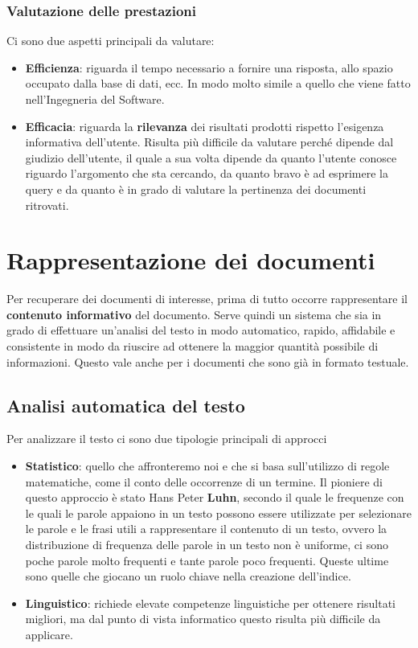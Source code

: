 \subsection{Valutazione delle prestazioni}

Ci sono due aspetti principali da valutare:

\begin{itemize}
	\item \textbf{Efficienza}: riguarda il tempo necessario a fornire una risposta, allo spazio occupato dalla base di dati, ecc. In modo molto simile a quello che viene fatto nell'Ingegneria del Software.
	\item \textbf{Efficacia}: riguarda la \textbf{rilevanza} dei risultati prodotti rispetto l'esigenza informativa dell'utente. Risulta più difficile da valutare perché dipende dal giudizio dell'utente, il quale a sua volta dipende da quanto l'utente conosce riguardo l'argomento che sta cercando, da quanto bravo è ad esprimere la query e da quanto è in grado di valutare la pertinenza dei documenti ritrovati.
\end{itemize}

\chapter{Rappresentazione dei documenti}

Per recuperare dei documenti di interesse, prima di tutto occorre rappresentare il \textbf{contenuto informativo} del documento.
Serve quindi un sistema che sia in grado di effettuare un'analisi del testo in modo automatico, rapido, affidabile e consistente in modo da riuscire ad ottenere la maggior quantità possibile di informazioni.
Questo vale anche per i documenti che sono già in formato testuale.

\section{Analisi automatica del testo}

Per analizzare il testo ci sono due tipologie principali di approcci

\begin{itemize}
	\item \textbf{Statistico}: quello che affronteremo noi e che si basa sull'utilizzo di regole matematiche, come il conto delle occorrenze di un termine. Il pioniere di questo approccio è stato Hans Peter \textbf{Luhn}, secondo il quale {\color{Red}le frequenze con le quali le parole appaiono in un testo possono essere utilizzate per selezionare le parole e le frasi utili a rappresentare il contenuto di un testo}, ovvero la distribuzione di frequenza delle parole in un testo non è uniforme, ci sono poche parole molto frequenti e tante parole poco frequenti. Queste ultime sono quelle che giocano un ruolo chiave nella creazione dell'indice.
	\item \textbf{Linguistico}: richiede elevate competenze linguistiche per ottenere risultati migliori, ma dal punto di vista informatico questo risulta più difficile da applicare.
\end{itemize}
